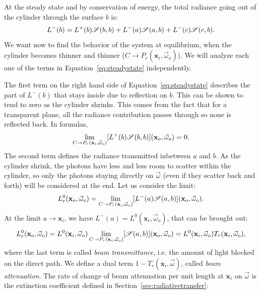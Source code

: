 At the steady state and by conservation of energy, the total radiance going out of the cylinder through the surface $b$ is:
\begin{equation}
\label{eq:steadystate}
L^-(b) = L^+(b)\mathscr{S}(b,b) + L^-(a)\mathscr{S}(a,b)  + L^-(c)\mathscr{S}(c,b).
\end{equation}
We want now to find the behavior of the system at equilibrium, when the cylinder becomes thinner and thinner ($C\rightarrow P_r(\mathbf{x}_i,\vec{\omega}_o)$). We will analyze each one of the terms in Equation~\ref{eq:steadystate} independently. 

The first term on the right hand side of Equation~\ref{eq:steadystate} describes the part of $L^-(b)$ that stays inside due to reflection on $b$. This can be shown to tend to zero as the cylinder shrinks. This comes from the fact that for a transparent plane, all the radiance contribution passes through so none is reflected back. In formulas,
\begin{equation}
\label{eq:zerolimit}
\lim_{C\rightarrow P_r(\mathbf{x}_i,\vec{\omega}_o)} [L^+(b)\mathscr{S}(b,b)] (\mathbf{x}_o, \vec{\omega}_o) = 0.
\end{equation}
The second term defines the radiance transmitted inbetween $a$ and $b$. As the cylinder shrink, the photons have less and less room to scatter within the cylinder, so only the photons staying directly on $\vec{\omega}$ (even if they scatter back and forth) will be considered at the end. Let us consider the limit:
\begin{equation*}
L_r^0(\mathbf{x}_o, \vec{\omega}_o) = \lim_{C\rightarrow P_r(\mathbf{x}_i,\vec{\omega}_o)} [L^-(a)\mathscr{S}(a,b)] (\mathbf{x}_o, \vec{\omega}_o).
\end{equation*}
At the limit $a \rightarrow \mathbf{x}_i$, we have $L^-(a) = L^0(\mathbf{x}_i, \vec{\omega}_o)$, that can be brought out: 
\begin{equation}
\label{eq:l0r}
L_r^0(\mathbf{x}_o, \vec{\omega}_o) = L^0(\mathbf{x}_i, \vec{\omega}_o)\lim_{C\rightarrow P_r(\mathbf{x}_i,\vec{\omega}_o)} [\mathscr{S}(a,b)] (\mathbf{x}_o, \vec{\omega}_o) = L^0(\mathbf{x}_i, \vec{\omega}_o) T_r(\mathbf{x}_i, \vec{\omega}_o),
\end{equation}
where the last term is called \emph{beam transmittance}, i.e. the amount of light blocked on the direct path. We define a dual term $1 -  T_r(\mathbf{x}_i, \vec{\omega})$, called \emph{beam attenuation}. The rate of change of beam attenuation per unit length at $\mathbf{x}_i$ on $\vec{\omega}$ is the extinction coefficient defined in Section~\ref{sec:radiativetransfer}:
